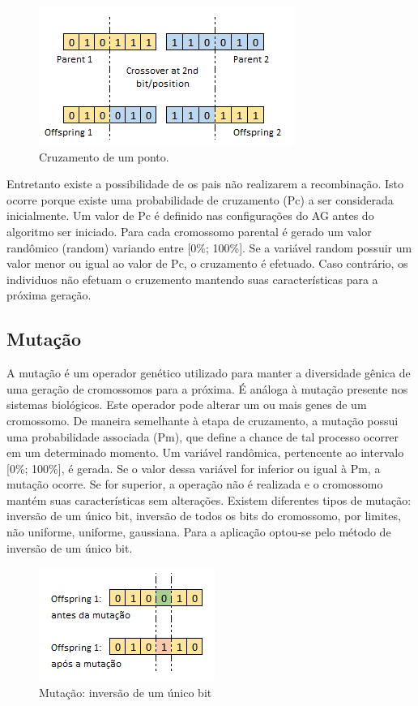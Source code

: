 \documentclass[twoside]{article}
\begin{document}
\begin{multicols}{2}
\begin{figure}[H]
\label{fig:c1p}
  \caption{Cruzamento de um ponto.}
  \centering
    \includegraphics[scale = 0.9]{crossover_onepoint.png}
\end{figure}

Entretanto existe a possibilidade de os pais não realizarem a recombinação. Isto ocorre porque existe uma probabilidade de cruzamento (Pc) a ser considerada inicialmente. Um valor de Pc é definido nas configurações do AG antes do algoritmo ser iniciado. Para cada cromossomo parental é gerado um valor randômico (random) variando entre [0\%; 100\%]. Se a variável random possuir um valor menor ou igual ao valor de Pc, o cruzamento é efetuado. Caso contrário, os individuos não efetuam o cruzemento mantendo suas características para a próxima geração.

\subsection{Mutação}
A mutação é um operador genético utilizado para manter a diversidade gênica de uma geração de cromossomos para a próxima. É análoga à mutação presente nos sistemas biológicos. Este operador pode alterar um ou mais genes de um cromossomo. De maneira semelhante à etapa de cruzamento, a mutação possui uma probabilidade associada (Pm), que define a chance de tal processo ocorrer em um determinado momento. Um variável randômica, pertencente ao intervalo [0\%; 100\%], é gerada. Se o valor dessa variável for inferior ou igual à Pm, a mutação ocorre. Se for superior, a operação não é realizada e o cromossomo mantém suas características sem alterações.
Existem diferentes tipos de mutação: inversão de um único bit, inversão de todos os bits do cromossomo, por limites, não uniforme, uniforme, gaussiana. Para a aplicação optou-se pelo método de inversão de um único bit.

\begin{figure}[H]
\label{fig:mut}
  \caption{Mutação: inversão de um único bit}
  \centering
    \includegraphics[scale = 0.9]{mutation.png}
\end{figure}


\end{multicols}
\end{document}
